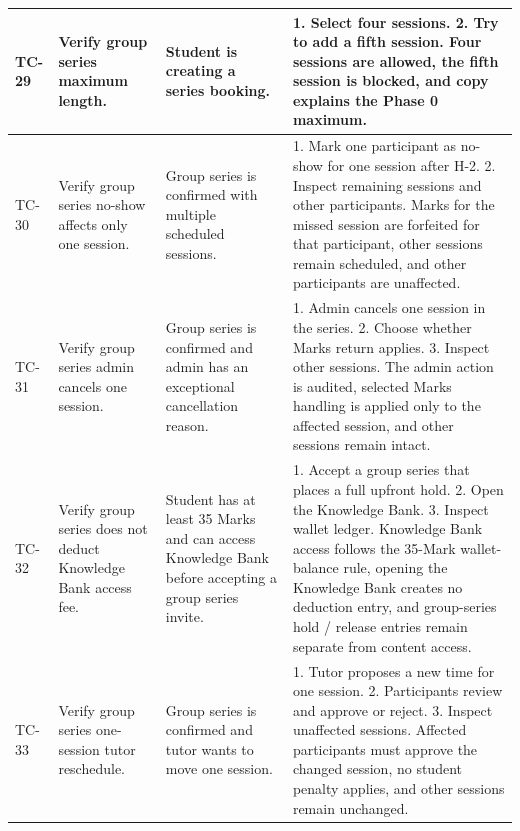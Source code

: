 \documentclass[11pt,a4paper]{article}
\begin{document}
\begin{longtable}{|L{1.2cm}|L{3.3cm}|L{3.9cm}|L{6.0cm}|}
	\hline
	TC-29          & Verify group series maximum length.              & Student is creating a series booking.                                & 1. Select four sessions. 2. Try to add a fifth session. \newline Four sessions are allowed, the fifth session is blocked, and copy explains the Phase 0 maximum.                                                      \\
	\hline
	TC-30          & Verify group series no-show affects only one session.              & Group series is confirmed with multiple scheduled sessions.                                & 1. Mark one participant as no-show for one session after H-2. 2. Inspect remaining sessions and other participants. \newline Marks for the missed session are forfeited for that participant, other sessions remain scheduled, and other participants are unaffected.                                                      \\
	\hline
	TC-31          & Verify group series admin cancels one session.              & Group series is confirmed and admin has an exceptional cancellation reason.                                & 1. Admin cancels one session in the series. 2. Choose whether Marks return applies. 3. Inspect other sessions. \newline The admin action is audited, selected Marks handling is applied only to the affected session, and other sessions remain intact.                                                      \\
	\hline
	TC-32          & Verify group series does not deduct Knowledge Bank access fee.              & Student has at least 35 Marks and can access Knowledge Bank before accepting a group series invite.                                & 1. Accept a group series that places a full upfront hold. 2. Open the Knowledge Bank. 3. Inspect wallet ledger. \newline Knowledge Bank access follows the 35-Mark wallet-balance rule, opening the Knowledge Bank creates no deduction entry, and group-series hold / release entries remain separate from content access.                                                      \\
	\hline
	TC-33          & Verify group series one-session tutor reschedule.              & Group series is confirmed and tutor wants to move one session.                                & 1. Tutor proposes a new time for one session. 2. Participants review and approve or reject. 3. Inspect unaffected sessions. \newline Affected participants must approve the changed session, no student penalty applies, and other sessions remain unchanged.                                                      \\

\end{longtable}
\end{document}
